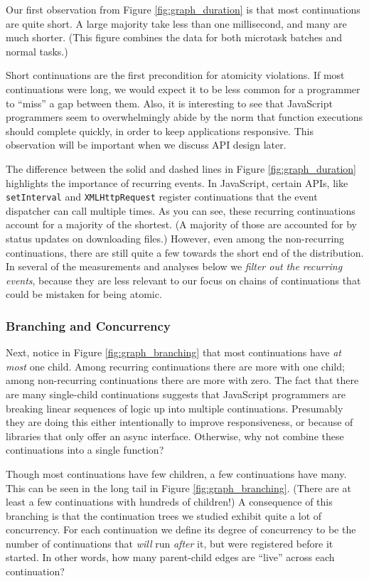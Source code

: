 \documentclass[acmsmall,anonymous,review]{acmart}\settopmatter{printfolios=true,printccs=false,printacmref=false}
\begin{document}
Our first observation from Figure \ref{fig:graph_duration} is that most continuations are quite short.
A large majority take less than one millisecond, and many are much shorter.
(This figure combines the data for both microtask batches and normal tasks.)

Short continuations are the first precondition for atomicity violations.
If most continuations were long, we would expect it to be less common for a programmer to ``miss'' a gap between them.
Also, it is interesting to see that JavaScript programmers seem to overwhelmingly abide by the norm that function executions should complete quickly, in order to keep applications responsive.
This observation will be important when we discuss API design later.

The difference between the solid and dashed lines in Figure \ref{fig:graph_duration} highlights the importance of recurring events.
In JavaScript, certain APIs, like \texttt{setInterval} and \texttt{XMLHttpRequest} register continuations that the event dispatcher can call multiple times.
As you can see, these recurring continuations account for a majority of the shortest.
(A majority of those are accounted for by status updates on downloading files.)
However, even among the non-recurring continuations, there are still quite a few towards the short end of the distribution.
In several of the measurements and analyses below we \emph{filter out the recurring events}, because they are less relevant to our focus on chains of continuations that could be mistaken for being atomic.

\subsubsection{Branching and Concurrency}

Next, notice in Figure \ref{fig:graph_branching} that most continuations have \emph{at most} one child.
Among recurring continuations there are more with one child; among non-recurring continuations there are more with zero.
The fact that there are many single-child continuations suggests that JavaScript programmers are breaking linear sequences of logic up into multiple continuations.
Presumably they are doing this either intentionally to improve responsiveness, or because of libraries that only offer an async interface.
Otherwise, why not combine these continuations into a single function?

Though most continuations have few children, a few continuations have many.
This can be seen in the long tail in Figure \ref{fig:graph_branching}.
(There are at least a few continuations with hundreds of children!)
A consequence of this branching is that the continuation trees we studied exhibit quite a lot of concurrency.
For each continuation we define its degree of concurrency to be the number of continuations that \emph{will} run \emph{after} it, but were registered before it started.
In other words, how many parent-child edges are ``live'' across each continuation?
\end{document}
